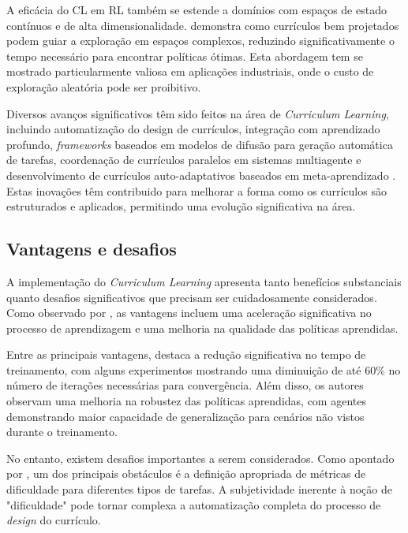 A eficácia do CL em RL também se estende a domínios com espaços de estado contínuos e de alta dimensionalidade. \cite{curml} demonstra como currículos bem projetados podem guiar a exploração em espaços complexos, reduzindo significativamente o tempo necessário para encontrar políticas ótimas. Esta abordagem tem se mostrado particularmente valiosa em aplicações industriais, onde o custo de exploração aleatória pode ser proibitivo.

Diversos avanços significativos têm sido feitos na área de \textit{Curriculum Learning}, incluindo automatização do design de currículos, integração com aprendizado profundo, \textit{frameworks} baseados em modelos de difusão para geração automática de tarefas, coordenação de currículos paralelos em sistemas multiagente e desenvolvimento de currículos auto-adaptativos baseados em meta-aprendizado \cite{curriculum_reinforcement_learning} \cite{diffusion_based_curriculum_reinforcement_learning} \cite{curriculum_learning_in_rl} \cite{variational_curriculum_rl}. Estas inovações têm contribuido para melhorar a forma como os currículos são estruturados e aplicados, permitindo uma evolução significativa na área.

\subsection{Vantagens e desafios}
\label{subsec:curriculum_vantagens_desafios}

A implementação do \textit{Curriculum Learning} apresenta tanto benefícios substanciais quanto desafios significativos que precisam ser cuidadosamente considerados. Como observado por \cite{curriculum_learning_in_rl}, as vantagens incluem uma aceleração significativa no processo de aprendizagem e uma melhoria na qualidade das políticas aprendidas.

Entre as principais vantagens, \cite{curriculum_reinforcement_learning} destaca a redução significativa no tempo de treinamento, com alguns experimentos mostrando uma diminuição de até 60\% no número de iterações necessárias para convergência. Além disso, os autores observam uma melhoria na robustez das políticas aprendidas, com agentes demonstrando maior capacidade de generalização para cenários não vistos durante o treinamento.

No entanto, existem desafios importantes a serem considerados. Como apontado por \cite{boosted_curriculum_rl}, um dos principais obstáculos é a definição apropriada de métricas de dificuldade para diferentes tipos de tarefas. A subjetividade inerente à noção de "dificuldade" pode tornar complexa a automatização completa do processo de \textit{design} do currículo.

